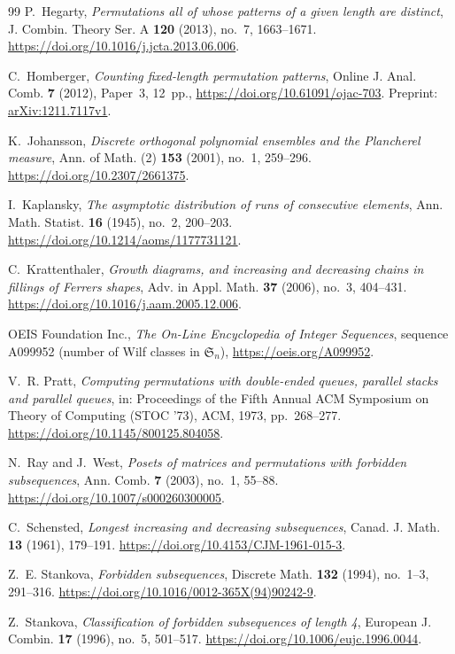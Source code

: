 \documentclass[11pt,reqno]{amsart}
\theoremstyle{plain}
\theoremstyle{definition}
\theoremstyle{remark}
\newcommand{\Sym}{\mathfrak{S}}
\begin{document}
\begin{thebibliography}{99}
P.~Hegarty, \emph{Permutations all of whose patterns of a given length are distinct}, J. Combin. Theory Ser. A \textbf{120} (2013), no.~7, 1663--1671. \url{https://doi.org/10.1016/j.jcta.2013.06.006}.

C.~Homberger, \emph{Counting fixed-length permutation patterns}, Online J. Anal. Comb. \textbf{7} (2012), Paper~3, 12~pp., \url{https://doi.org/10.61091/ojac-703}. Preprint: \href{https://arxiv.org/abs/1211.7117v1}{arXiv:1211.7117v1}.

K.~Johansson, \emph{Discrete orthogonal polynomial ensembles and the Plancherel measure}, Ann. of Math. (2) \textbf{153} (2001), no.~1, 259--296. \url{https://doi.org/10.2307/2661375}.

I.~Kaplansky, \emph{The asymptotic distribution of runs of consecutive elements}, Ann. Math. Statist. \textbf{16} (1945), no.~2, 200--203. \url{https://doi.org/10.1214/aoms/1177731121}.

C.~Krattenthaler, \emph{Growth diagrams, and increasing and decreasing chains in fillings of Ferrers shapes}, Adv. in Appl. Math. \textbf{37} (2006), no.~3, 404--431. \url{https://doi.org/10.1016/j.aam.2005.12.006}.

OEIS Foundation Inc., \emph{The On-Line Encyclopedia of Integer Sequences}, sequence A099952 (number of Wilf classes in $\Sym_n$), \url{https://oeis.org/A099952}.

V.~R. Pratt, \emph{Computing permutations with double-ended queues, parallel stacks and parallel queues}, in: Proceedings of the Fifth Annual ACM Symposium on Theory of Computing (STOC '73), ACM, 1973, pp.~268--277. \url{https://doi.org/10.1145/800125.804058}.

N.~Ray and J.~West, \emph{Posets of matrices and permutations with forbidden subsequences}, Ann. Comb. \textbf{7} (2003), no.~1, 55--88. \url{https://doi.org/10.1007/s000260300005}.

C.~Schensted, \emph{Longest increasing and decreasing subsequences}, Canad. J. Math. \textbf{13} (1961), 179--191. \url{https://doi.org/10.4153/CJM-1961-015-3}.

Z.~E. Stankova, \emph{Forbidden subsequences}, Discrete Math. \textbf{132} (1994), no.~1--3, 291--316. \url{https://doi.org/10.1016/0012-365X(94)90242-9}.

Z.~Stankova, \emph{Classification of forbidden subsequences of length 4}, European J. Combin. \textbf{17} (1996), no.~5, 501--517. \url{https://doi.org/10.1006/eujc.1996.0044}.


\end{thebibliography}
\end{document}
